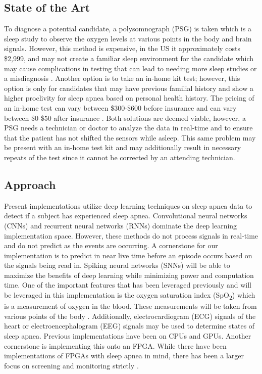 \documentclass[12pt,titlepage]{article}
\begin{document}
\subsection{State of the Art}
To diagnose a potential candidate, a polysomnograph (PSG) is taken which is a sleep study to observe the oxygen levels at various points in the body
and brain signals. However, this method is expensive, in the US it approximately costs \$2,999, and may not create a familiar sleep environment
for the candidate which may cause complications in testing that can lead to needing more sleep studies or a misdiagnosis \cite{mdsave}. Another
option is to take an in-home kit test; however, this option is only for candidates that may have previous familial history and show a higher proclivity
for sleep apnea based on personal health history. The pricing of an in-home test can vary between \$300-\$600 before insurance and can vary between
\$0-\$50 after insurance \cite{rodriguez_2016}. Both solutions are deemed viable, however, a PSG needs a technician or doctor to analyze the data in
real-time and to ensure that the patient has not shifted the sensors while asleep. This same problem may be present with an in-home test kit and may
additionally result in necessary repeats of the test since it cannot be corrected by an attending technician. 

\subsection{Approach}
Present implementations utilize deep learning techniques on sleep apnea data to detect if a subject has experienced sleep apnea. Convolutional neural
networks (CNNs) and recurrent neural networks (RNNs) dominate the deep learning implementation space. However, these methods do not process signals in
real-time and do not predict as the events are occurring. A cornerstone for our implementation is to predict in near live time before an episode occurs
based on the signals being read in. Spiking neural networks (SNNs) will be able to maximize the benefits of deep learning while minimizing power and computation
time. One of the important features that has been leveraged previously and will be leveraged in this implementation is the oxygen saturation index (SpO\textsubscript{2})
which is a measurement of oxygen in the blood. These measurements will be taken from various points of the body \cite{mostafa}. Additionally, electrocardiogram
(ECG) signals of the heart or electroencephalogram (EEG) signals may be used to determine states of sleep apnea. Previous implementations
have been on CPUs and GPUs. Another cornerstone is implementing this onto an FPGA. While there have been implementations of FPGAs with sleep apnea in mind,
there has been a larger focus on screening and monitoring strictly \cite{ashmouny}.
\end{document}

